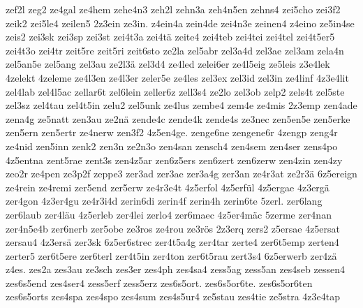 {    zef2l
    zeg2
    ze4gal
    ze4hem
    zehe4n3
    zeh2l
    zehn3a
    zeh4n5en
    zehns4
    zei5cho
    zei3f2
    zeik2
    zei5le4
    zeilen5
    2z3ein
    ze3in.
    z4ein4a
    zein4de
    zei4n3e
    zeinen4
    z4eino
    ze5in4se
    zeis2
    zei3sk
    zei3sp
    zei3st
    zei4t3a
    zei4tä
    zeite4
    zei4teb
    zei4tei
    zei4tel
    zei4t5er5
    zei4t3o
    zei4tr
    zeit5re
    zeit5ri
    zeit6sto
    ze2la
    zel5abr
    zel3a4d
    zel3ae
    zel3am
    zela4n
    zel5an5e
    zel5ang
    zel3au
    ze2l3ä
    zel3d4
    ze4led
    zelei6er
    ze4l5eig
    ze5leis
    z3e4lek
    4zelekt
    4zeleme
    ze4l3en
    ze4l3er
    zeler5e
    ze4les
    zel3ex
    zel3id
    zel3in
    ze4linf
    4z3e4lit
    zel4lab
    zel4l5ac
    zellar6t
    zel6lein
    zeller6z
    zell3s4
    ze2lo
    zel3ob
    zelp2
    zels4t
    zel5ste
    zel3sz
    zel4tau
    zel4t5in
    zelu2
    zel5unk
    ze4lus
    zembe4
    zem4e
    ze4mis
    2z3emp
    zen4ade
    zena4g
    ze5natt
    zen3au
    ze2nä
    zende4c
    zende4k
    zende4s
    ze3nec
    zen5en5e
    zen5erke
    zen5ern
    zen5ertr
    ze4nerw
    zen3f2
    4z5en4ge.
    zenge6ne
    zengene6r
    4zengp
    zeng4r
    ze4nid
    zen5inn
    zenk2
    zen3n
    ze2n3o
    zen4san
    zensch4
    zen4sem
    zen4ser
    zens4po
    4z5entna
    zent5rae
    zent3s
    zen4z5ar
    zen6z5ers
    zen6zert
    zen6zerw
    zen4zin
    zen4zy
    zeo2r
    ze4pen
    ze3p2f
    zeppe3
    zer3ad
    zer3ae
    zer3a4g
    zer3an
    ze4r3at
    ze2r3ä
    6z5ereign
    ze4rein
    ze4remi
    zer5end
    zer5erw
    ze4r3e4t
    4z5erfol
    4z5erfül
    4z5ergae
    4z3ergä
    zer4gon
    4z3er4gu
    ze4r3i4d
    zerin6di
    zerin4f
    zerin4h
    zerin6te
    5zerl.
    zer6lang
    zer6laub
    zer4läu
    4z5erleb
    zer4lei
    zerlo4
    zer6maec
    4z5er4mäc
    5zerme
    zer4nan
    zer4n5e4b
    zer6nerb
    zer5obe
    ze3ros
    ze4rou
    ze3rös
    2z3erq
    zers2
    z5ersae
    4z5ersat
    zersau4
    4z3ersä
    zer3sk
    6z5er6strec
    zer4t5a4g
    zer4tar
    zerte4
    zer6t5emp
    zerten4
    zerter5
    zer6t5ere
    zer6terl
    zer4t5in
    zer4ton
    zer6t5rau
    zert3s4
    6z5erwerb
    zer4zä
    z4es.
    zes2a
    zes3au
    ze3sch
    zes3er
    zes4ph
    zes4sa4
    zess5ag
    zess5an
    zes4seb
    zessen4
    zes6s5end
    zes4ser4
    zess5erf
    zess5erz
    zes6s5ort.
    zes6s5or6te.
    zes6s5or6ten
    zes6s5orts
    zes4spa
    zes4spo
    zes4sum
    zes4s5ur4
    ze5stau
    zes4tie
    ze5stra
    4z3e4tap
}
